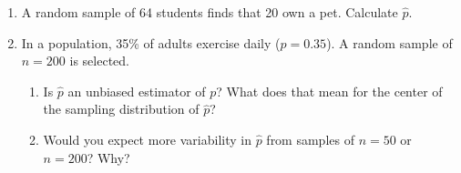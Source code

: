 \documentclass[10pt]{article}
\begin{document}
\namedateperiod

\vspace{0.15in}

\begin{enumerate}

  \item A random sample of 64 students finds that 20 own a pet. Calculate $\hat{p}$.
        \vspace{0.5in}

  \item In a population, 35\% of adults exercise daily ($p = 0.35$). A random sample of
        $n = 200$ is selected.
        \begin{enumerate}[label=\alph*.]
          \item Is $\hat{p}$ an unbiased estimator of $p$? What does that mean for the
                center of the sampling distribution of $\hat{p}$?
          \item Would you expect more variability in $\hat{p}$ from samples of $n = 50$
                or $n = 200$? Why?
        \end{enumerate}

\end{enumerate}
\end{document}
